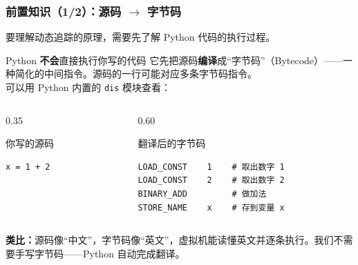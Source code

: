 \documentclass[presentation,aspectratio=169]{ctexbeamer}
\begin{document}
\begin{frame}[fragile]
\frametitle{前置知识（1/2）：源码 $\rightarrow$ 字节码}
{\footnotesize 要理解动态追踪的原理，需要先了解 Python 代码的执行过程。}

\vspace{0.1cm}
\begin{block}{\footnotesize Python \textbf{不会}直接执行你写的代码}
{\footnotesize 它先把源码\textbf{编译}成``字节码''（Bytecode）——一种简化的中间指令。源码的一行可能对应多条字节码指令。\\
可以用 Python 内置的 \texttt{dis} 模块查看：}
\end{block}

\vspace{0.1cm}
\begin{columns}[T]
\begin{column}{0.35\textwidth}
\begin{block}{\footnotesize 你写的源码}
{\footnotesize
\begin{verbatim}
x = 1 + 2
\end{verbatim}}
\end{block}
\end{column}
\begin{column}{0.60\textwidth}
\begin{block}{\footnotesize 翻译后的字节码}
{\footnotesize
\begin{verbatim}
LOAD_CONST    1    # 取出数字 1
LOAD_CONST    2    # 取出数字 2
BINARY_ADD         # 做加法
STORE_NAME    x    # 存到变量 x
\end{verbatim}}
\end{block}
\end{column}
\end{columns}

\vspace{0.1cm}
{\footnotesize \textbf{类比：}源码像``中文''，字节码像``英文''，虚拟机能读懂英文并逐条执行。我们不需要手写字节码——Python 自动完成翻译。}
\end{frame}

\end{document}
